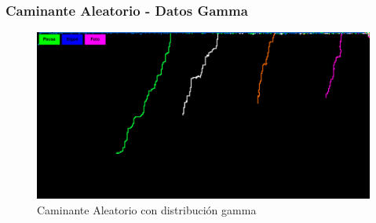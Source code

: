 \begin{frame}
	\frametitle{Caminante Aleatorio - Datos Gamma}
	\begin{figure}
		\centering
		\includegraphics[width=\textwidth]{walkerGamma} %
		\caption{Caminante Aleatorio con distribución gamma}
	\end{figure}
\end{frame}



